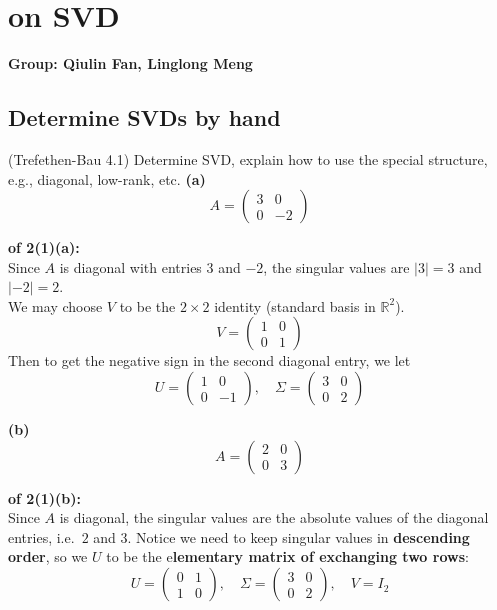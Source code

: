 \documentclass[lang=cn,11pt]{elegantbook}
\begin{document}
\chapter{on SVD}
\textbf{Group: Qiulin Fan, Linglong Meng}
\section{Determine SVDs by hand}
(Trefethen-Bau 4.1) Determine SVD, explain how to use the special structure, e.g., diagonal, low-rank, etc.
\textbf{(a) }$$A = \begin{pmatrix}3 & 0\\[6pt]0 & -2\end{pmatrix}$$
\begin{solution}\textbf{ of 2(1)(a):}\\
Since $A$ is diagonal with entries $3$ and $-2$, the singular values are $|3|=3$ and $|-2|=2$.\\
We may choose $V$ to be the $2\times 2$ identity (standard basis in $\mathbb{R}^2$). 
$$
V = \begin{pmatrix}1 & 0\\[4pt]0 & 1\end{pmatrix}
$$
Then to get the negative sign in the second diagonal entry, we let \[
    U =  \begin{pmatrix}1 & 0\\0 & -1\end{pmatrix},
    \quad
    \Sigma =  \begin{pmatrix}3 & 0\\0 & 2\end{pmatrix}
  \]
\end{solution}
\textbf{(b) }$$A = \begin{pmatrix}2 & 0\\[6pt]0 & 3\end{pmatrix}$$
\begin{solution}\textbf{ of 2(1)(b):}\\
Since $A$ is diagonal, the singular values are the absolute values of the diagonal entries, i.e.\ $2$ and $3$. 
Notice we need to keep singular values in \textbf{descending order}, so we $U$ to be the e\textbf{lementary matrix of exchanging two rows}:
\[
  U =  \begin{pmatrix}0 & 1\\1 & 0\end{pmatrix},\quad
  \Sigma = \begin{pmatrix}3 & 0\\0 & 2\end{pmatrix},\quad
  V = I_2
\]
\end{solution}
\end{document}

